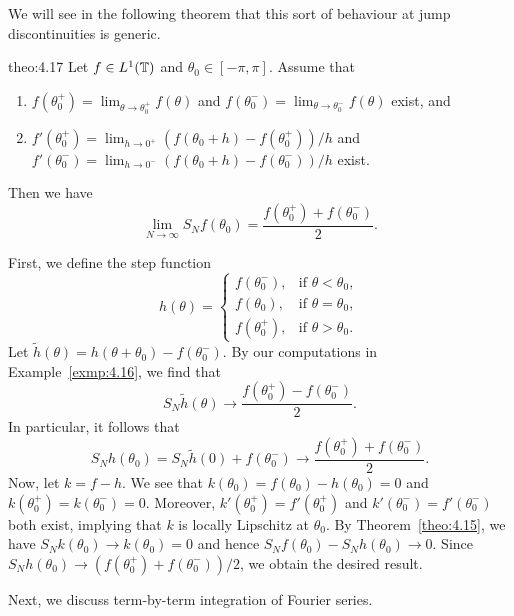 We will see in the following theorem that this sort of behaviour at jump 
discontinuities is generic. 

\begin{theo}{theo:4.17}
    Let $f \in L^1(\mathbb{T})$ and $\theta_0 \in [-\pi, \pi]$. Assume that 
    \begin{enumerate}[(1)]
        \item $f(\theta_0^+) = \lim_{\theta\to\theta_0^+} f(\theta)$ 
        and $f(\theta_0^-) = \lim_{\theta\to\theta_0^-} f(\theta)$ exist, and 
        \item $f'(\theta_0^+) = \lim_{h\to0^+} (f(\theta_0+h) - f(\theta_0^+))/h$ 
        and $f'(\theta_0^-) = \lim_{h\to0^-} (f(\theta_0+h) - f(\theta_0^-))/h$ exist. 
    \end{enumerate} 
    Then we have 
    \[ \lim_{N\to\infty} S_N f(\theta_0) = \frac{f(\theta_0^+) + f(\theta_0^-)}{2}. \]
\end{theo}
\begin{pf}
    First, we define the step function 
    \[ h(\theta) = \begin{cases}
        f(\theta_0^-), & \text{if } \theta < \theta_0, \\ 
        f(\theta_0), & \text{if } \theta = \theta_0, \\ 
        f(\theta_0^+), & \text{if } \theta > \theta_0.
    \end{cases} \] 
    Let $\tilde h(\theta) = h(\theta + \theta_0) - f(\theta_0^-)$. 
    By our computations in Example~\ref{exmp:4.16}, we find that 
    \[ S_N \tilde h(\theta) \to \frac{f(\theta_0^+) - f(\theta_0^-)}{2}. \] 
    In particular, it follows that 
    \[ S_N h(\theta_0) = S_N \tilde h(0) + f(\theta_0^-) \to
    \frac{f(\theta_0^+) + f(\theta_0^-)}{2}. \] 
    Now, let $k = f - h$. We see that $k(\theta_0) = f(\theta_0) - h(\theta_0) = 0$ 
    and $k(\theta_0^+) = k(\theta_0^-) = 0$. Moreover, 
    $k'(\theta_0^+) = f'(\theta_0^+)$ and $k'(\theta_0^-) = f'(\theta_0^-)$ 
    both exist, implying that $k$ is locally Lipschitz at $\theta_0$. 
    By Theorem~\ref{theo:4.15}, we have $S_N k(\theta_0) \to k(\theta_0) = 0$ 
    and hence $S_N f(\theta_0) - S_N h(\theta_0) \to 0$. Since 
    $S_N h(\theta_0) \to (f(\theta_0^+) + f(\theta_0^-))/2$, we obtain 
    the desired result.  
\end{pf}

Next, we discuss term-by-term integration of Fourier series. 

